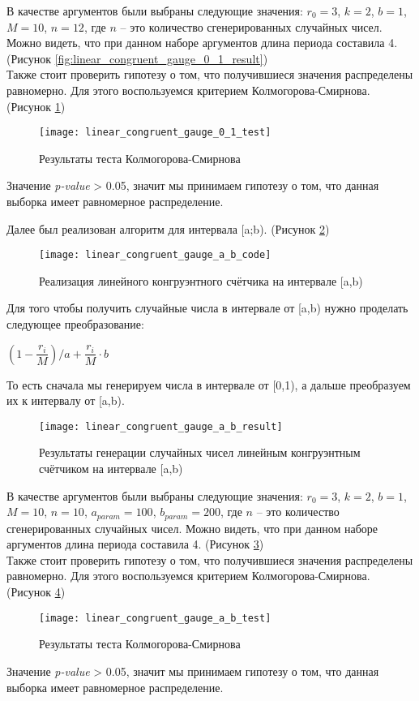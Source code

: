 В качестве аргументов были выбраны следующие значения: $r_0 = 3$, $k = 2$, $b = 1$, $M = 10$, $n = 12$, где $n$ -- это количество сгенерированных случайных чисел. Можно видеть, что при данном наборе аргументов длина периода составила 4. (Рисунок \ref{fig:linear_congruent_gauge_0_1_result})\\

Также стоит проверить гипотезу о том, что получившиеся значения распределены равномерно. Для этого воспользуемся критерием Колмогорова-Смирнова. (Рисунок \ref{fig:linear_congruent_gauge_0_1_test})
\begin{figure}[h]
	\centering \texttt{[image: linear\_congruent\_gauge\_0\_1\_test]}
	\caption{Результаты теста Колмогорова-Смирнова}
	\label{fig:linear_congruent_gauge_0_1_test}
\end{figure}

Значение \textit{p-value} > 0.05, значит мы принимаем гипотезу о том, что данная выборка имеет равномерное распределение.

\newpage
Далее был реализован алгоритм для интервала [a;b). (Рисунок \ref{fig:linear_congruent_gauge_a_b_code})
\begin{figure}[h]
	\centering \texttt{[image: linear\_congruent\_gauge\_a\_b\_code]}
	\caption{Реализация линейного конгруэнтного счётчика на интервале [a,b)}
	\label{fig:linear_congruent_gauge_a_b_code}
\end{figure}

Для того чтобы получить случайные числа в интервале от [a,b) нужно проделать следующее преобразование:
\begin{center}
	$(1 - \dfrac{r_i}{M})/a + \dfrac{r_i}{M} \cdot b$
\end{center}
То есть сначала мы генерируем числа в интервале от [0,1), а дальше преобразуем их к интервалу от [a,b).
\begin{figure}[h]
	\centering \texttt{[image: linear\_congruent\_gauge\_a\_b\_result]}
	\caption{Результаты генерации случайных чисел линейным конгруэнтным счётчиком на интервале [a,b)}
	\label{fig:linear_congruent_gauge_a_b_result}
\end{figure}
\newpage
В качестве аргументов были выбраны следующие значения: $r_0 = 3$, $k = 2$, $b = 1$, $M = 10$, $n = 10$, $a_{param} = 100$, $b_{param} = 200$, где $n$ -- это количество сгенерированных случайных чисел. Можно видеть, что при данном наборе аргументов длина периода составила 4. (Рисунок \ref{fig:linear_congruent_gauge_a_b_result})\\

Также стоит проверить гипотезу о том, что получившиеся значения распределены равномерно. Для этого воспользуемся критерием Колмогорова-Смирнова. (Рисунок \ref{fig:linear_congruent_gauge_a_b_test})
\begin{figure}[h]
	\centering \texttt{[image: linear\_congruent\_gauge\_a\_b\_test]}
	\caption{Результаты теста Колмогорова-Смирнова}
	\label{fig:linear_congruent_gauge_a_b_test}
\end{figure}

Значение \textit{p-value} > 0.05, значит мы принимаем гипотезу о том, что данная выборка имеет равномерное распределение.